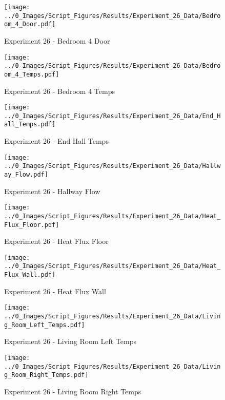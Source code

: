 	\clearpage

	\begin{figure}[H]
		\centering
		\texttt{[image: ../0\_Images/Script\_Figures/Results/Experiment\_26\_Data/Bedroom\_4\_Door.pdf]}
		\caption[]{Experiment 26 - Bedroom 4 Door}
	\end{figure}
 

	\begin{figure}[H]
		\centering
		\texttt{[image: ../0\_Images/Script\_Figures/Results/Experiment\_26\_Data/Bedroom\_4\_Temps.pdf]}
		\caption[]{Experiment 26 - Bedroom 4 Temps}
	\end{figure}
 
	\clearpage

	\begin{figure}[H]
		\centering
		\texttt{[image: ../0\_Images/Script\_Figures/Results/Experiment\_26\_Data/End\_Hall\_Temps.pdf]}
		\caption[]{Experiment 26 - End Hall Temps}
	\end{figure}
 

	\begin{figure}[H]
		\centering
		\texttt{[image: ../0\_Images/Script\_Figures/Results/Experiment\_26\_Data/Hallway\_Flow.pdf]}
		\caption[]{Experiment 26 - Hallway Flow}
	\end{figure}
 
	\clearpage

	\begin{figure}[H]
		\centering
		\texttt{[image: ../0\_Images/Script\_Figures/Results/Experiment\_26\_Data/Heat\_Flux\_Floor.pdf]}
		\caption[]{Experiment 26 - Heat Flux Floor}
	\end{figure}
 

	\begin{figure}[H]
		\centering
		\texttt{[image: ../0\_Images/Script\_Figures/Results/Experiment\_26\_Data/Heat\_Flux\_Wall.pdf]}
		\caption[]{Experiment 26 - Heat Flux Wall}
	\end{figure}
 
	\clearpage

	\begin{figure}[H]
		\centering
		\texttt{[image: ../0\_Images/Script\_Figures/Results/Experiment\_26\_Data/Living\_Room\_Left\_Temps.pdf]}
		\caption[]{Experiment 26 - Living Room Left Temps}
	\end{figure}
 

	\begin{figure}[H]
		\centering
		\texttt{[image: ../0\_Images/Script\_Figures/Results/Experiment\_26\_Data/Living\_Room\_Right\_Temps.pdf]}
		\caption[]{Experiment 26 - Living Room Right Temps}
	\end{figure}
 
